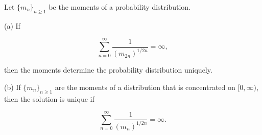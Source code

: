 Let $\{m_n\}_{n \geq 1}$ be the moments of a probability distribution.

(a) If

$$\sum_{n=0}^{\infty} \frac{1}{(m_{2n})^{1/2n}} = \infty,$$

then the moments determine the probability distribution uniquely.

(b) If $\{m_n\}_{n \geq 1}$ are the moments of a distribution that is concentrated on $[0, \infty)$, then the solution is unique if

$$\sum_{n=0}^{\infty} \frac{1}{(m_n)^{1/2n}} = \infty.$$
